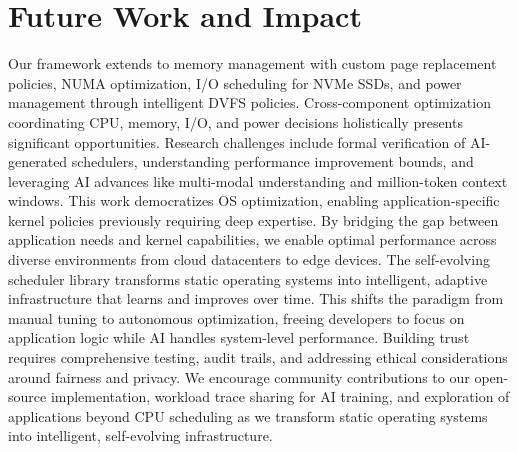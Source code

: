 \section{Future Work and Impact}

Our framework extends to memory management with custom page replacement policies, NUMA optimization, I/O scheduling for NVMe SSDs, and power management through intelligent DVFS policies. Cross-component optimization coordinating CPU, memory, I/O, and power decisions holistically presents significant opportunities. Research challenges include formal verification of AI-generated schedulers, understanding performance improvement bounds, and leveraging AI advances like multi-modal understanding and million-token context windows. This work democratizes OS optimization, enabling application-specific kernel policies previously requiring deep expertise. By bridging the gap between application needs and kernel capabilities, we enable optimal performance across diverse environments from cloud datacenters to edge devices. The self-evolving scheduler library transforms static operating systems into intelligent, adaptive infrastructure that learns and improves over time. This shifts the paradigm from manual tuning to autonomous optimization, freeing developers to focus on application logic while AI handles system-level performance. Building trust requires comprehensive testing, audit trails, and addressing ethical considerations around fairness and privacy. We encourage community contributions to our open-source implementation, workload trace sharing for AI training, and exploration of applications beyond CPU scheduling as we transform static operating systems into intelligent, self-evolving infrastructure.